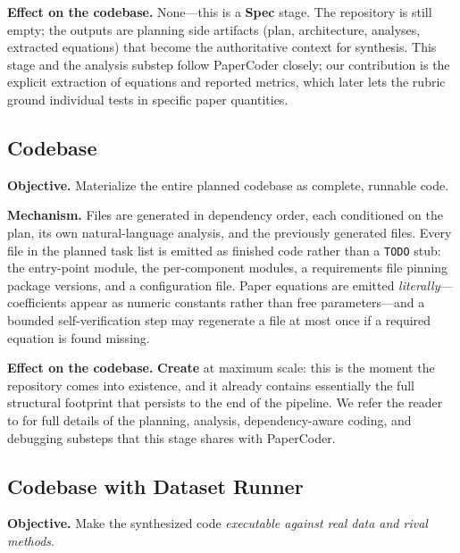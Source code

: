 \documentclass[11pt]{article}
\begin{document}
\textbf{Effect on the codebase.} None---this is a \textbf{Spec} stage. The repository is still empty; the outputs are planning side artifacts (plan, architecture, analyses, extracted equations) that become the authoritative context for synthesis. This stage and the analysis substep follow PaperCoder \citep{seo2025papercoder} closely; our contribution is the explicit extraction of equations and reported metrics, which later lets the rubric ground individual tests in specific paper quantities.

\subsection{Codebase}

\textbf{Objective.} Materialize the entire planned codebase as complete, runnable code.

\textbf{Mechanism.} Files are generated in dependency order, each conditioned on the plan, its own natural-language analysis, and the previously generated files. Every file in the planned task list is emitted as finished code rather than a \texttt{TODO} stub: the entry-point module, the per-component modules, a requirements file pinning package versions, and a configuration file. Paper equations are emitted \emph{literally}---coefficients appear as numeric constants rather than free parameters---and a bounded self-verification step may regenerate a file at most once if a required equation is found missing.

\textbf{Effect on the codebase.} \textbf{Create} at maximum scale: this is the moment the repository comes into existence, and it already contains essentially the full structural footprint that persists to the end of the pipeline. We refer the reader to \citet{seo2025papercoder} for full details of the planning, analysis, dependency-aware coding, and debugging substeps that this stage shares with PaperCoder.

\subsection{Codebase with Dataset Runner}

\textbf{Objective.} Make the synthesized code \emph{executable against real data and rival methods}.
\end{document}
